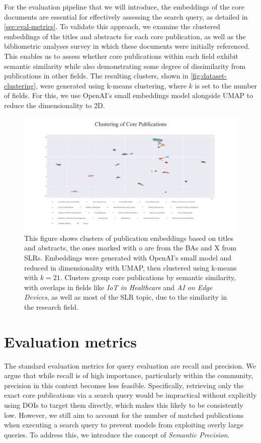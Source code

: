 For the evaluation pipeline that we will introduce, the embeddings of the core documents are essential for effectively assessing the search query, as detailed in \autoref{sec:eval-metrics}. To validate this approach, we examine the clustered embeddings of the titles and abstracts for each core publication, as well as the bibliometric analyses survey in which these documents were initially referenced. This enables us to assess whether core publications within each field exhibit semantic similarity while also demonstrating some degree of dissimilarity from publications in other fields. The resulting clusters, shown in \autoref{fig:dataset-clustering}, were generated using k-means clustering, where $k$ is set to the number of fields. For this, we use OpenAI's small embeddings model alongside UMAP\autocite{mcinnes2020umap} to reduce the dimensionality to 2D.

\begin{figure}
	\centering	
	\includegraphics[scale=0.6]{pics/umap_clustering.pdf}
	\caption[Core Publications Clustering]{This figure shows clusters of publication embeddings based on titles and abstracts, the ones marked with o are from the BAs and X from SLRs. Embeddings were generated with OpenAI's small model and reduced in dimensionality with UMAP, then clustered using k-means with $k=21$. Clusters group core publications by semantic similarity, with overlaps in fields like \textit{IoT in Healthcare} and \textit{AI on Edge Devices}, as well as most of the SLR topic, due to the similarity in the research field.}
	\label{fig:dataset-clustering}
\end{figure}

\section{Evaluation metrics}\label{sec:eval-metrics}
The standard evaluation metrics for query evaluation are recall and precision. We argue that while recall is of high importance, particularly within the community, precision in this context becomes less feasible. Specifically, retrieving only the exact core publications via a search query would be impractical without explicitly using DOIs to target them directly, which makes this likely to be consistently low. However, we still aim to account for the number of matched publications when executing a search query to prevent models from exploiting overly large queries. To address this, we introduce the concept of \textit{Semantic Precision}.

